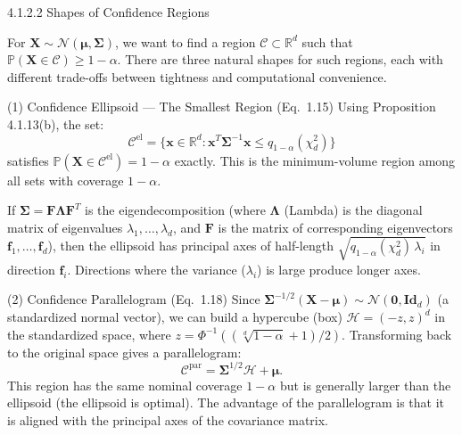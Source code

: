 \documentclass[aspectratio=169,10pt]{beamer}
\begin{document}
\begin{frame}[allowframebreaks]{4.1.2.2 Shapes of Confidence Regions}

For $\mathbf{X} \sim \mathcal{N}(\boldsymbol{\mu}, \boldsymbol{\Sigma})$,
we want to find a region $\mathcal{C} \subset \mathbb{R}^d$ such that
$\mathbb{P}(\mathbf{X} \in \mathcal{C}) \geq 1-\alpha$.  There are three
natural shapes for such regions, each with different trade-offs between
tightness and computational convenience.

\begin{block}{(1) Confidence Ellipsoid --- The Smallest Region (Eq.\ 1.15)}
  Using Proposition 4.1.13(b), the set:
  \[
    \mathcal{C}^{\mathrm{el}} = \bigl\{\mathbf{x} \in \mathbb{R}^d
      : \mathbf{x}^T\boldsymbol{\Sigma}^{-1}\mathbf{x} \leq q_{1-\alpha}(\chi_d^2)\bigr\}
  \]
  satisfies $\mathbb{P}(\mathbf{X} \in \mathcal{C}^{\mathrm{el}}) = 1-\alpha$
  exactly.  This is the minimum-volume region among all sets with coverage
  $1-\alpha$.

  If $\boldsymbol{\Sigma} = \mathbf{F}\boldsymbol{\Lambda}\mathbf{F}^T$
  is the eigendecomposition (where $\boldsymbol{\Lambda}$ (Lambda) is
  the diagonal matrix of eigenvalues $\lambda_1, \ldots, \lambda_d$, and
  $\mathbf{F}$ is the matrix of corresponding eigenvectors $\mathbf{f}_1,
  \ldots, \mathbf{f}_d$), then the ellipsoid has principal axes of
  half-length $\sqrt{q_{1-\alpha}(\chi_d^2)\,\lambda_i}$ in direction
  $\mathbf{f}_i$.  Directions where the variance ($\lambda_i$) is large
  produce longer axes.
\end{block}

\begin{block}{(2) Confidence Parallelogram (Eq.\ 1.18)}
  Since $\boldsymbol{\Sigma}^{-1/2}(\mathbf{X}-\boldsymbol{\mu}) \sim
  \mathcal{N}(\mathbf{0}, \mathbf{Id}_d)$ (a standardized normal vector),
  we can build a hypercube (box) $\mathcal{H} = (-z, z)^d$ in the
  standardized space, where
  $z = \Phi^{-1}\!\left((\sqrt[d]{1-\alpha}+1)/2\right)$.
  Transforming back to the original space gives a parallelogram:
  \[
    \mathcal{C}^{\mathrm{par}} = \boldsymbol{\Sigma}^{1/2}\mathcal{H} + \boldsymbol{\mu}.
  \]
  This region has the same nominal coverage $1-\alpha$ but is generally
  larger than the ellipsoid (the ellipsoid is optimal).  The advantage of
  the parallelogram is that it is aligned with the principal axes of the
  covariance matrix.
\end{block}


\end{frame}
\end{document}
